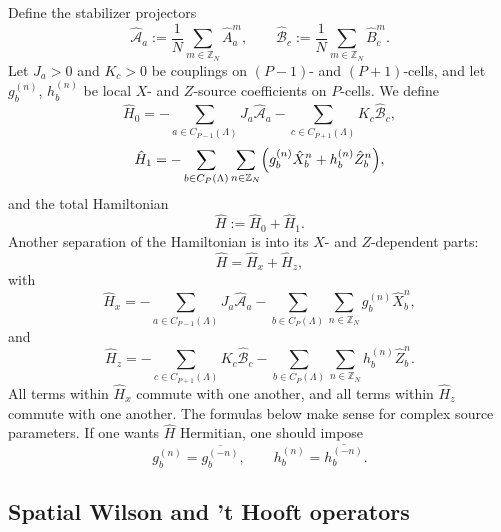 \documentclass[dvipsnames,a4paper]{article}
\numberwithin{equation}{section}
\theoremstyle{definition}
\theoremstyle{remark}
\begin{document}
Define the stabilizer projectors
\begin{equation}
	\hat{\mathcal A}_a
	:=
	\frac1N\sum_{m\in\mathbb Z_N}\hat A_a^m,
	\qquad
	\hat{\mathcal B}_c
	:=
	\frac1N\sum_{m\in\mathbb Z_N}\hat B_c^m.
	\label{eq:projectors}
\end{equation}
Let \(J_a>0\) and \(K_c>0\) be couplings on \((P-1)\)- and \((P+1)\)-cells, and let
\(g_b^{(n)}\), \(h_b^{(n)}\) be local \(X\)- and \(Z\)-source coefficients on \(P\)-cells.
We define
\begin{equation}
	\hat H_0
	=
	-\sum_{a\in C_{P-1}(\Lambda)}J_a\hat{\mathcal A}_a
	-\sum_{c\in C_{P+1}(\Lambda)}K_c\hat{\mathcal B}_c,
	\label{eq:H0}
\end{equation}
\begin{equation}
	\hat H_1
	=
	-\sum_{b\in C_P(\Lambda)}
	\sum_{n\in\mathbb Z_N}
	\Bigl(
	g_b^{(n)}\hat X_b^n+h_b^{(n)}\hat Z_b^n
	\Bigr),
	\label{eq:H1}
\end{equation}
and the total Hamiltonian
\begin{equation}
	\hat H:=\hat H_0+\hat H_1 .
	\label{eq:H}
\end{equation}
Another separation of the Hamiltonian is into its $X$- and $Z$-dependent parts: 
\begin{equation}
	\hat H=\hat H_x+\hat H_z,
\end{equation}
with
\begin{equation}
	\hat H_x
	=
	-\sum_{a\in C_{P-1}(\Lambda)}J_a\hat{\mathcal A}_a
	-\sum_{b\in C_P(\Lambda)}
	\sum_{n\in\mathbb Z_N}g_b^{(n)}\hat X_b^n,
	\label{eq:Hx}
\end{equation}
and
\begin{equation}
	\hat H_z
	=
	-\sum_{c\in C_{P+1}(\Lambda)}K_c\hat{\mathcal B}_c
	-\sum_{b\in C_P(\Lambda)}
	\sum_{n\in\mathbb Z_N}h_b^{(n)}\hat Z_b^n.
	\label{eq:Hz}
\end{equation}
All terms within \(\hat H_x\) commute with one another, and all terms within \(\hat H_z\)
commute with one another. The formulas below make sense for complex source parameters. If
one wants \(\hat H\) Hermitian, one should impose
\begin{equation}
g_b^{(n)}=\overline{g_b^{(-n)}},
\qquad
h_b^{(n)}=\overline{h_b^{(-n)}}.
\end{equation}

\subsection{Spatial Wilson and 't Hooft operators}
\label{sec:spatial-topological-operators}
\end{document}
